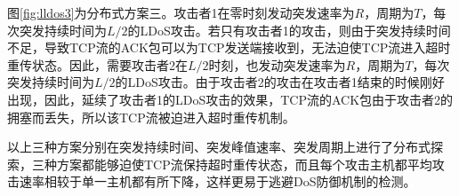 
图\ref{fig:lldos3}为分布式方案三。攻击者1在零时刻发动突发速率为$R$，周期为$T$，每次突发持续时间为$L/2$的LDoS攻击。若只有攻击者1的攻击，则由于突发持续时间不足，导致TCP流的ACK包可以为TCP发送端接收到，无法迫使TCP流进入超时重传状态。因此，需要攻击者2在$L/2$时刻，也发动突发速率为$R$，周期为$T$，每次突发持续时间为$L/2$的LDoS攻击。由于攻击者2的攻击在攻击者1结束的时候刚好出现，因此，延续了攻击者1的LDoS攻击的效果，TCP流的ACK包由于攻击者2的拥塞而丢失，所以该TCP流被迫进入超时重传机制。

以上三种方案分别在突发持续时间、突发峰值速率、突发周期上进行了分布式探索，三种方案都能够迫使TCP流保持超时重传状态，而且每个攻击主机都平均攻击速率相较于单一主机都有所下降，这样更易于逃避DoS防御机制的检测。

